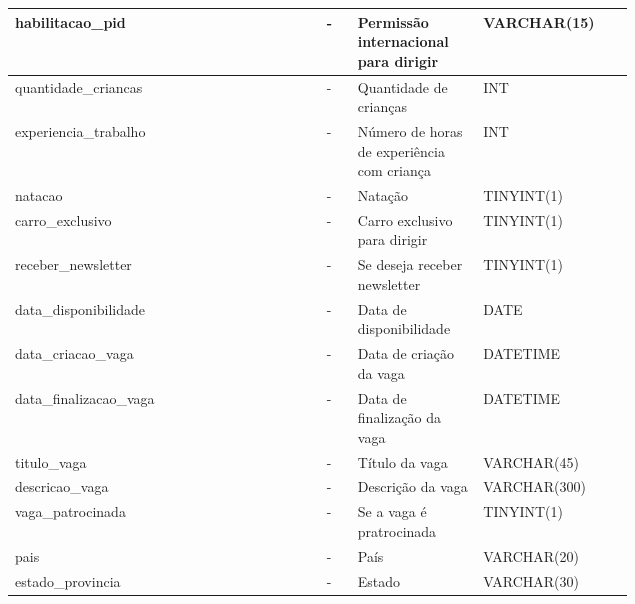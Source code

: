 \begin{enumerate}
\begin{table}[H]
\begin{tabular}{|p{0.40\linewidth} | p{0.04\linewidth} |  p{0.12\linewidth} | p{0.16\linewidth} |}
       habilitacao\_pid &
       - &
       Permissão internacional para dirigir &
       VARCHAR(15)
       \\ \hline
       
       quantidade\_criancas &
       - &
       Quantidade de crianças &
       INT
       \\ \hline
       
       experiencia\_trabalho &
       - &
       Número de horas de experiência com criança &
       INT
       \\ \hline
       
       natacao &
       - &
       Natação &
       TINYINT(1)
       \\ \hline
       
       carro\_exclusivo &
       - &
       Carro exclusivo para dirigir &
       TINYINT(1)
       \\ \hline
       
       receber\_newsletter &
       - &
       Se deseja receber newsletter &
       TINYINT(1)
       \\ \hline
       
       data\_disponibilidade &
       - &
       Data de disponibilidade &
       DATE
       \\ \hline
       
       data\_criacao\_vaga &
       - &
       Data de criação da vaga &
       DATETIME
       \\ \hline
       
       data\_finalizacao\_vaga &
       - &
       Data de finalização da vaga &
       DATETIME
       \\ \hline
       
       titulo\_vaga &
       - &
       Título da vaga &
       VARCHAR(45)
       \\ \hline
       
       descricao\_vaga &
       - &
       Descrição da vaga &
       VARCHAR(300)
       \\ \hline
       
       vaga\_patrocinada &
       - &
       Se a vaga é pratrocinada &
       TINYINT(1)
       \\ \hline
       
       pais &
       - &
       País &
       VARCHAR(20)
       \\ \hline
       
       estado\_provincia &
       - &
       Estado &
       VARCHAR(30)
       \\ \hline
       
        \end{tabular}
    \end{table}
\end{enumerate}

